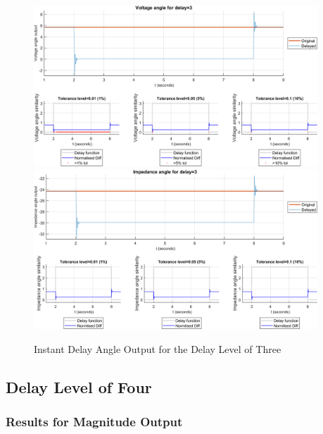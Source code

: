 \begin{figure}
    \caption{Instant Delay Angle Output for the Delay Level of Three}
    \includegraphics[width=0.95\textwidth]{PMUsim-figures/DelayOf_3/Instant_vAngle.png}    
    \includegraphics[width=0.95\textwidth]{PMUsim-figures/DelayOf_3/Instant_iAngle.png}    
    \label{fig:PMUsim_Three_Angle}
        \begin{small}
     \end{small}
\end{figure}


\newpage \subsection{Delay Level of Four}
\subsubsection{Results for Magnitude Output}

